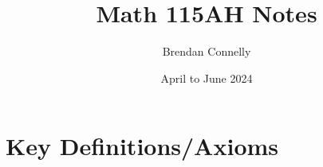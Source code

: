\documentclass{article}
\title{Math 115AH Notes}
\author{Brendan Connelly}
\date{April to June 2024}
\begin{document}
\theoremstyle{definition}
\newtheorem*{definition}{Definition}
\newtheorem*{theorem}{Theorem}
\newtheorem*{proposition}{Proposition}
\newtheorem*{lemma}{Lemma}
\newtheorem*{corollary}{Corollary}





\maketitle

\section*{Key Definitions/Axioms}
\end{document}
